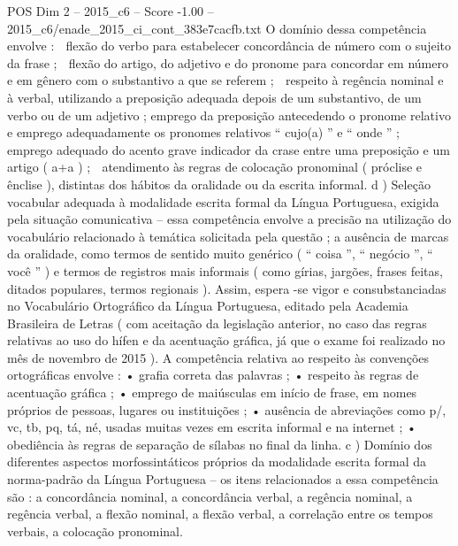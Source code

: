 \begin{textsample}{POS Dim 2 – 2015\_c6 – Score -1.00 – 2015\_c6/enade\_2015\_ci\_cont\_383e7cacfb.txt}
O domínio dessa competência envolve :  flexão do verbo para estabelecer concordância de número com o sujeito da frase ;  flexão do artigo, do adjetivo e do pronome para concordar em número e em gênero com o substantivo a que se referem ;  respeito à regência nominal e à verbal, utilizando a preposição adequada depois de um substantivo, de um verbo ou de um adjetivo ; emprego da preposição antecedendo o pronome relativo e emprego adequadamente os pronomes relativos “ cujo(a) ” e “ onde ” ;  emprego adequado do acento grave indicador da crase entre uma preposição e um artigo ( a+a ) ;  atendimento às regras de colocação pronominal ( próclise e ênclise ), distintas dos hábitos da oralidade ou da escrita informal. d ) Seleção vocabular adequada à modalidade escrita formal da Língua Portuguesa, exigida pela situação comunicativa – essa competência envolve a precisão na utilização do vocabulário relacionado à temática solicitada pela questão ; a ausência de marcas da oralidade, como termos de sentido muito genérico ( “ coisa ”, “ negócio ”, “ você ” ) e termos de registros mais informais ( como gírias, jargões, frases feitas, ditados populares, termos regionais ).
Assim, espera -se vigor e consubstanciadas no Vocabulário Ortográfico da Língua Portuguesa, editado pela Academia Brasileira de Letras ( com aceitação da legislação anterior, no caso das regras relativas ao uso do hífen e da acentuação gráfica, já que o exame foi realizado no mês de novembro de 2015 ).
A competência relativa ao respeito às convenções ortográficas envolve : • grafia correta das palavras ; • respeito às regras de acentuação gráfica ; • emprego de maiúsculas em início de frase, em nomes próprios de pessoas, lugares ou instituições ; • ausência de abreviações como p/, vc, tb, pq, tá, né, usadas muitas vezes em escrita informal e na internet ; • obediência às regras de separação de sílabas no final da linha. c ) Domínio dos diferentes aspectos morfossintáticos próprios da modalidade escrita formal da norma-padrão da Língua Portuguesa – os itens relacionados a essa competência são : a concordância nominal, a concordância verbal, a regência nominal, a regência verbal, a flexão nominal, a flexão verbal, a correlação entre os tempos verbais, a colocação pronominal.

\end{textsample}
